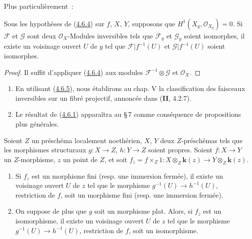 Plus particulièrement~:

\begin{corollary}[4.6.5]
\label{III.4.6.5-fr}
Sous les hypothèses de \textup{(\hyperref[III.4.6.4-fr]{4.6.4})} sur $f$, $X$, $Y$,
supposons que $H^1(X_y,\mathcal O_{X_y})=0$. Si $\mathcal F$ et $\mathcal G$
sont deux $\mathcal O_X$-Modules inversibles tels que $\mathcal F_y$ et
$\mathcal G_y$ soient isomorphes, il existe un voisinage ouvert $U$ de $y$
tel que $\mathcal F|f^{-1}(U)$ et $\mathcal G|f^{-1}(U)$ soient isomorphes.
\end{corollary}

\begin{proof}
Il suffit d'appliquer (\hyperref[III.4.6.4-fr]{4.6.4}) aux modules
$\mathcal F^{-1}\otimes\mathcal G$ et $\mathcal O_X$.
\end{proof}

\begin{remarks}[4.6.6]
\label{III.4.6.6-fr}
\begin{enumerate}
\item[(i)] En utilisant (\hyperref[III.4.6.5-fr]{4.6.5}), nous établirons au
chap. V la classification des faisceaux inversibles sur un fibré projectif,
annoncée dans (\textbf{II}, 4.2.7).
\item[(ii)] Le résultat de (\hyperref[III.4.6.1-fr]{4.6.1}) apparaîtra au
\S\,7 comme conséquence de propositions plus générales.
\end{enumerate}
\end{remarks}

\begin{proposition}[4.6.7]
\label{III.4.6.7-fr}
Soient $Z$ un préschéma localement noethérien, $X$, $Y$ deux $Z$-préschémas
tels que les morphismes structuraux $g:X\to Z$, $h:Y\to Z$ soient propres.
Soient $f:X\to Y$ un $Z$-morphisme, $z$ un point de $Z$, et soit
$f_z=f\times_Z1:
X\otimes_Z\boldsymbol{k}(z)\longrightarrow Y\otimes_Z\boldsymbol{k}(z)$.
\begin{enumerate}
\item[\textup{(i)}] Si $f_z$ est un morphisme fini \textup{(resp.} une immersion fermée), il
existe un voisinage ouvert $U$ de $z$ tel que le morphisme
$g^{-1}(U)\to h^{-1}(U)$, restriction de $f$, soit un morphisme fini \textup{(resp.}
une immersion fermée).
\item[\textup{(ii)}] On suppose de plus que $g$ soit un morphisme plat. Alors, si
$f_z$ est un isomorphisme, il existe un voisinage ouvert $U$ de $z$ tel que
le morphisme $g^{-1}(U)\to h^{-1}(U)$, restriction de $f$, soit un
isomorphisme.
\end{enumerate}
\end{proposition}

